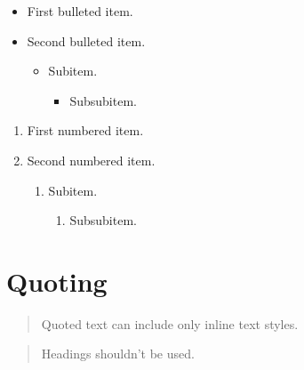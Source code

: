 \documentclass[10pt]{article}
\begin{document}
\begin{itemize}

\item First bulleted item.

\item Second bulleted item.

    \begin{itemize}

    \item Subitem.

        \begin{itemize}

        \item Subsubitem.

        \end{itemize}

    \end{itemize}

\end{itemize}


\begin{enumerate}

\item First numbered item.

\item Second numbered item.

    \begin{enumerate}

    \item Subitem.

        \begin{enumerate}

        \item Subsubitem.

        \end{enumerate}

    \end{enumerate}

\end{enumerate}

\section{Quoting}

\begin{quotation}
Quoted text can include only inline text styles.
\end{quotation}

\begin{quotation}
Headings shouldn’t be used.
\end{quotation}
\end{document}
